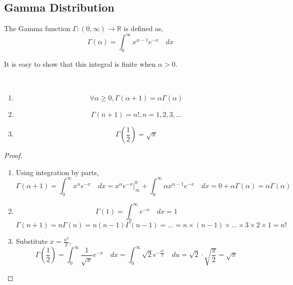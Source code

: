 \subsection{Gamma Distribution}
\begin{definition}
The Gamma function $\Gamma : (0, \infty) \rightarrow \mathbb{R}$ is defined as,
\[
    \Gamma(\alpha) = \int_{0}^{\infty} x^{\alpha - 1} e^{-x} \quad dx
\]
\end{definition}
\note It is easy to show that this integral is finite when $\alpha > 0$.

\begin{theorem} \quad                                                        \\
\begin{enumerate}[noitemsep, topsep=0em]
\item \[ \forall \alpha \geq 0, \Gamma(\alpha + 1) = \alpha \Gamma(\alpha) \]
\item \[ \Gamma(n + 1) = n!, n = 1, 2, 3, \dots                            \]
\item \[ \Gamma(\frac{1}{2}) = \sqrt{\pi}                                  \]
\end{enumerate}
\end{theorem}
\begin{proof} \quad                                                          \\
\begin{enumerate}[noitemsep, topsep=0em]
\item Using integration by parts,
\[
      \Gamma(\alpha + 1) = \int_0^{\infty} x^\alpha e^{-x} \quad dx
    = \left. x^\alpha e^{-x} \right\vert_{\infty}^0 +
      \int_0^{\infty} \alpha x^{\alpha - 1} e^{-x} \quad dx
    = 0 + \alpha \Gamma(\alpha)
    = \alpha \Gamma(\alpha)
\]
\item
\[
    \Gamma(1) = \int_{0}^{\infty} e^{-x} \quad dx = 1
\]
\[
    \Gamma(n + 1) = n \Gamma(n)
                  = n (n - 1) \Gamma(n - 1)
                  = \dots
                  = n \times (n - 1) \times \dots \times 3 \times 2 \times 1
                  = n!
\]
\item Substitute $x = \frac{u^2}{2}$, 
\[
    \Gamma(\frac{1}{2}) = \int_{0}^{\infty} \frac{1}{\sqrt{x}} e^{-x} \quad dx
                        = \int_{0}^{\infty} \sqrt{2} e^{-\frac{u^2}{2}} \quad
                          du
                        = \sqrt{2} \cdot \sqrt{\frac{\pi}{2}}
                        = \sqrt{\pi}
\]
\end{enumerate}
\end{proof}

